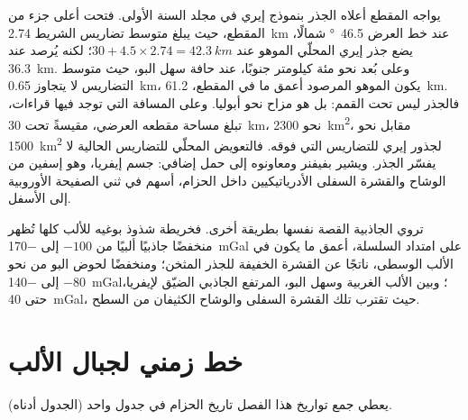 يواجه المقطع أعلاه الجذر بنموذج إيري في مجلد السنة
الأولى. فتحت أعلى جزء من المقطع، حيث يبلغ متوسط تضاريس الشريط
\qty{2.74}{km} عند خط العرض \qty{46.5}{\degree} شمالًا، يضع جذر إيري المحلّي الموهو عند
$30 + 4.5 \times 2.74 = \qty{42.3}{km}$؛ لكنه يُرصد عند \qty{36.3}{km}. وعلى بُعد نحو مئة
كيلومتر جنوبًا، عند حافة سهل البو، حيث متوسط التضاريس لا يتجاوز
\qty{0.65}{km}، يكون الموهو المرصود أعمق ما في المقطع، \qty{61.2}{km}. فالجذر ليس تحت القمم: بل
هو مزاح نحو أبوليا. وعلى المسافة التي توجد فيها قراءات، تبلغ مساحة مقطعه العرضي، مقيسةً
تحت \qty{30}{km}، نحو \qty{2300}{km^2}، مقابل نحو \qty{1500}{km^2} لجذور إيري
للتضاريس التي فوقه. فالتعويض المحلّي للتضاريس الحالية لا
يفسّر الجذر. ويشير بفيفنر ومعاونوه إلى حمل إضافي: جسم إيفريا، وهو إسفين من
الوشاح والقشرة السفلى الأدرياتيكيين داخل الحزام، أسهم في ثني الصفيحة الأوروبية
إلى الأسفل.

تروي الجاذبية القصة نفسها بطريقة أخرى. فخريطة شذوذ بوغيه للألب كلها تُظهر
منخفضًا جاذبيًا ألبيًا من $-100$ إلى \qty{-170}{mGal} على امتداد السلسلة، أعمق ما يكون في الألب
الوسطى، ناتجًا عن القشرة الخفيفة للجذر المثخن؛ ومنخفضًا لحوض البو من نحو $-80$ إلى
\qty{-140}{mGal}؛ وبين الألب الغربية وسهل البو، المرتفع الجاذبي الضيّق لإيفريا،
حتى \qty{+40}{mGal}، حيث تقترب تلك القشرة السفلى والوشاح الكثيفان من
السطح.

\section{خط زمني لجبال الألب}\label{sec:b2:alpine-orogen:timeline}

يعطي جمع تواريخ هذا الفصل تاريخ الحزام في جدول واحد
(الجدول أدناه).

